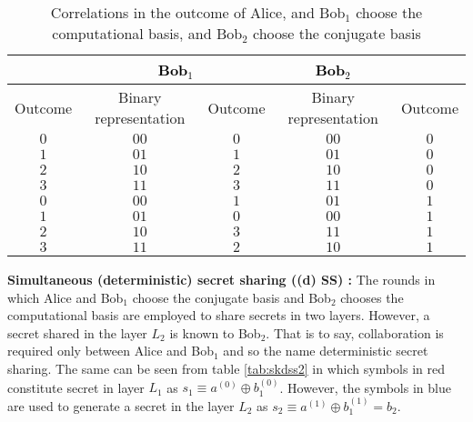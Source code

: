 \documentclass[fleqn,10pt]{wlscirep}
\begin{document}
\begin{table}[h!]
    \centering
    \begin{tabular}{|c|c|c|c|c|}
    \hline\rowcolor{lightgray}
       \multicolumn{2}{|c|}{\textcolor{black}{Alice}} &\multicolumn{2}{|c|}{\textcolor{black}{Bob$_1$}} & \textcolor{black}{Bob$_2$} \\
    \hline
    \rowcolor{lightgray}
      Outcome & Binary representation & Outcome & Binary representation & Outcome \\
    \hline\hline
    \rowcolor{white}
     $0$ & {\color{blue}$0$}{\color{red}$0$} & $0$ & {\color{blue}$0$}{\color{red}$0$} & {\color{red}$0$} \\
    \rowcolor{lightgray}
     $1$ & {\color{blue}$0$}{\color{red}$1$} & $1$ & {\color{blue}$0$}{\color{red}$1$} & {\color{red}$0$} \\
    \rowcolor{white}
     $2$ & {\color{blue} $1$}{\color{red}$0$} & $2$ & {\color{blue}$1$}{\color{red}$0$} & {\color{red}$0$} \\
    \rowcolor{lightgray}
     $3$ & {\color{blue} $1$}{\color{red}$1$} & $3$ & {\color{blue}$1$}{\color{red}$1$} & {\color{red}$0$} \\
     \hline
    \rowcolor{white}
     $0$ & {\color{blue} $0$}{\color{red}$0$} & $1$ & {\color{blue}$0$}{\color{red}$1$} & {\color{red}$1$} \\
    \rowcolor{lightgray}
     $1$ & {\color{blue}$0$}{\color{red}$1$} & $0$ & {\color{blue}$0$}{\color{red}$0$} & {\color{red}$1$} \\
    \rowcolor{white}
     $2$ & {\color{blue}$1$}{\color{red}$0$} & $3$ & {\color{blue} $1$}{\color{red}$1$} & {\color{red}$1$} \\
    \rowcolor{lightgray}
     $3$ & {\color{blue}$1$}{\color{red}$1$} & $2$ & {\color{blue}$1$}{\color{red}$0$} & {\color{red}$1$} \\
    \hline
    \end{tabular}
    \caption{Correlations in the outcome of Alice, and Bob$_1$ choose the computational basis, and Bob$_2$ choose the conjugate basis}
    \label{tab:skdss1}
\end{table}



\noindent\textbf{Simultaneous (deterministic) secret sharing ((d) SS) :} The rounds in which Alice and Bob$_1$ choose the conjugate basis and Bob$_2$ chooses the computational basis are employed to share secrets in two layers. However, a secret shared in the layer $L_2$ is known to Bob$_2$. That is to say, collaboration is required only between Alice and Bob$_1$ and so the name deterministic secret sharing. The same can be seen from table \ref{tab:skdss2} in which symbols in red constitute secret in layer $L_1$ as $s_1\equiv a^{(0)}\oplus b_1^{(0)}$. However, the symbols in blue are used to generate a secret in the layer $L_2$ as $s_2\equiv a^{(1)}\oplus b_1^{(1)}=b_2$.
\end{document}
